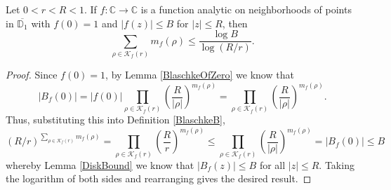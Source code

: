 \begin{theorem}[ZerosBound]
\label{ZerosBound}
\leanok
Let $0< r < R<1$. If $f:\mathbb{C}\to\mathbb{C}$ is a function analytic on
    neighborhoods of points in $\overline{\mathbb{D}_1}$ with $f(0)=1$ and $|f(z)|\leq B$
    for $|z|\leq R$, then
    $$\sum_{\rho\in\mathcal{K}_f(r)}m_f(\rho)\leq\frac{\log B}{\log(R/r)}.$$
\end{theorem}
\begin{proof}
\leanok
Since $f(0)=1$, by Lemma \ref{BlaschkeOfZero} we know that
    $$|B_f(0)|
      =|f(0)|\prod_{\rho\in\mathcal{K}_f(r)}\left(\frac{R}{|\rho|}\right)^{m_f(\rho)}
      =\prod_{\rho\in\mathcal{K}_f(r)}\left(\frac{R}{|\rho|}\right)^{m_f(\rho)}.$$
    Thus, substituting this into Definition \ref{BlaschkeB},
    $$(R/r)^{\sum_{\rho\in\mathcal{K}_f(r)}m_f(\rho)}
      =\prod_{\rho\in\mathcal{K}_f(r)}\left(\frac{R}{r}\right)^{m_f(\rho)}
      \leq\prod_{\rho\in\mathcal{K}_f(r)}\left(\frac{R}{|\rho|}\right)^{m_f(\rho)}
      =|B_f(0)|\leq B$$
    whereby Lemma \ref{DiskBound} we know that $|B_f(z)|\leq B$ for all $|z|\leq R$.
    Taking the logarithm of both sides and rearranging gives the desired result.
\end{proof}
